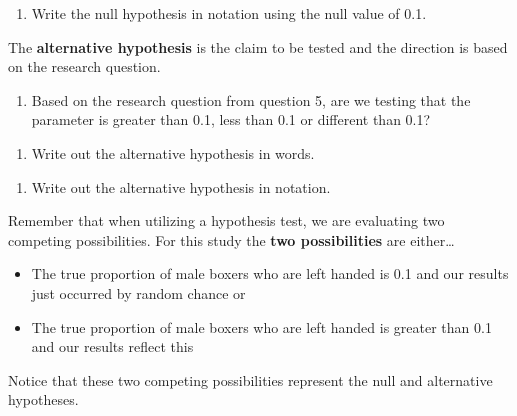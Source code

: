 \documentclass[
]{report}
\providecommand{\tightlist}{%
  \setlength{\itemsep}{0pt}\setlength{\parskip}{0pt}}
\begin{document}
\begin{enumerate}
\def\labelenumi{\arabic{enumi}.}
\setcounter{enumi}{10}
\tightlist
\item
  Write the null hypothesis in notation using the null value of 0.1.
\end{enumerate}

\vspace{0.5in}

The \textbf{alternative hypothesis} is the claim to be tested and the direction is based on the research question.

\begin{enumerate}
\def\labelenumi{\arabic{enumi}.}
\setcounter{enumi}{11}
\tightlist
\item
  Based on the research question from question 5, are we testing that the parameter is greater than 0.1, less than 0.1 or different than 0.1?
\end{enumerate}

\vspace{0.5in}

\begin{enumerate}
\def\labelenumi{\arabic{enumi}.}
\setcounter{enumi}{12}
\tightlist
\item
  Write out the alternative hypothesis in words.
\end{enumerate}

\vspace{1in}

\begin{enumerate}
\def\labelenumi{\arabic{enumi}.}
\setcounter{enumi}{13}
\tightlist
\item
  Write out the alternative hypothesis in notation.
\end{enumerate}

\vspace{0.5in}

Remember that when utilizing a hypothesis test, we are evaluating two competing possibilities. For this study the \textbf{two possibilities} are either\ldots{}

\begin{itemize}
\item
  The true proportion of male boxers who are left handed is 0.1 and our results just occurred by random chance or
\item
  The true proportion of male boxers who are left handed is greater than 0.1 and our results reflect this
\end{itemize}

Notice that these two competing possibilities represent the null and alternative hypotheses.
\end{document}
